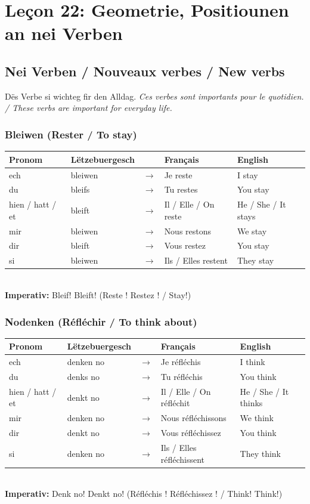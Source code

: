 \chapter{Leçon 22: Geometrie, Positiounen an nei Verben}

\section{Nei Verben / Nouveaux verbes / New verbs}

Dës Verbe si wichteg fir den Alldag. \textit{Ces verbes sont importants pour le quotidien. / These verbs are important for everyday life.}

\subsection*{Bleiwen (Rester / To stay)}
\begin{tabular}{ll c l l}
    \toprule
    \textbf{Pronom} & \textbf{Lëtzebuergesch} & \textbf{} & \textbf{Français} & \textbf{English} \\
    \midrule
    ech & bleiwen & $\rightarrow$ & Je reste & I stay \\
    du & bleifs & $\rightarrow$ & Tu restes & You stay \\
    hien / hatt / et & bleift & $\rightarrow$ & Il / Elle / On reste & He / She / It stays \\
    \midrule
    mir & bleiwen & $\rightarrow$ & Nous restons & We stay \\
    dir & bleift & $\rightarrow$ & Vous restez & You stay \\
    si & bleiwen & $\rightarrow$ & Ils / Elles restent & They stay \\
    \bottomrule
\end{tabular}
\\[1em]
\textbf{Imperativ:} Bleif! Bleift! (Reste ! Restez ! / Stay!)

\subsection*{Nodenken (Réfléchir / To think about)}
\begin{tabular}{ll c l l}
    \toprule
    \textbf{Pronom} & \textbf{Lëtzebuergesch} & \textbf{} & \textbf{Français} & \textbf{English} \\
    \midrule
    ech & denken no & $\rightarrow$ & Je réfléchis & I think \\
    du & denks no & $\rightarrow$ & Tu réfléchis & You think \\
    hien / hatt / et & denkt no & $\rightarrow$ & Il / Elle / On réfléchit & He / She / It thinks \\
    \midrule
    mir & denken no & $\rightarrow$ & Nous réfléchissons & We think \\
    dir & denkt no & $\rightarrow$ & Vous réfléchissez & You think \\
    si & denken no & $\rightarrow$ & Ils / Elles réfléchissent & They think \\
    \bottomrule
\end{tabular}
\\[1em]
\textbf{Imperativ:} Denk no! Denkt no! (Réfléchis ! Réfléchissez ! / Think! Think!)

